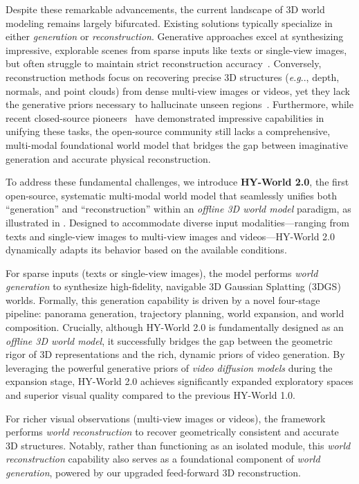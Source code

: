 \documentclass{article} %
\makeatletter
\DeclareRobustCommand\onedot{\futurelet\@let@token\@onedot}
\def\@onedot{\ifx\@let@token.\else.\null\fi\xspace}
\def\eg{\emph{e.g}\onedot} \def\Eg{\emph{E.g}\onedot}
\makeatother
\begin{document}
Despite these remarkable advancements, the current landscape of 3D world modeling remains largely bifurcated. Existing solutions typically specialize in either \textit{generation} or \textit{reconstruction}. 
Generative approaches excel at synthesizing impressive, explorable scenes from sparse inputs like texts or single-view images, but often struggle to maintain strict reconstruction accuracy~\cite{yang2025matrix,team2026advancing}. 
Conversely, reconstruction methods focus on recovering precise 3D structures (\eg, depth, normals, and point clouds) from dense multi-view images or videos, yet they lack the generative priors necessary to hallucinate unseen regions~\cite{wang2025vggt,wang2025pi,liu2025worldmirror,lin2025depth}. 
Furthermore, while recent closed-source pioneers~\cite{marble_worldlabs_2026} have demonstrated impressive capabilities in unifying these tasks, the open-source community still lacks a comprehensive, multi-modal foundational world model that bridges the gap between imaginative generation and accurate physical reconstruction.

To address these fundamental challenges, we introduce \textbf{HY-World 2.0}, the first open-source, systematic multi-modal world model that seamlessly unifies both ``generation'' and ``reconstruction'' within an \textit{offline 3D world model} paradigm, as illustrated in . 
Designed to accommodate diverse input modalities---ranging from texts and single-view images to multi-view images and videos---HY-World 2.0 dynamically adapts its behavior based on the available conditions.

For sparse inputs (texts or single-view images), the model performs \textit{world generation} to synthesize high-fidelity, navigable 3D Gaussian Splatting (3DGS) worlds. Formally, this generation capability is driven by a novel four-stage pipeline: panorama generation, trajectory planning, world expansion, and world composition. 
Crucially, although HY-World 2.0 is fundamentally designed as an \textit{offline 3D world model}, it successfully bridges the gap between the geometric rigor of 3D representations and the rich, dynamic priors of video generation. 
By leveraging the powerful generative priors of \textit{video diffusion models} during the expansion stage, HY-World 2.0 achieves significantly expanded exploratory spaces and superior visual quality compared to the previous HY-World 1.0.

For richer visual observations (multi-view images or videos), the framework performs \textit{world reconstruction} to recover geometrically consistent and accurate 3D structures. Notably, rather than functioning as an isolated module, this \textit{world reconstruction} capability also serves as a foundational component of \textit{world generation}, powered by our upgraded feed-forward 3D reconstruction.
\end{document}
